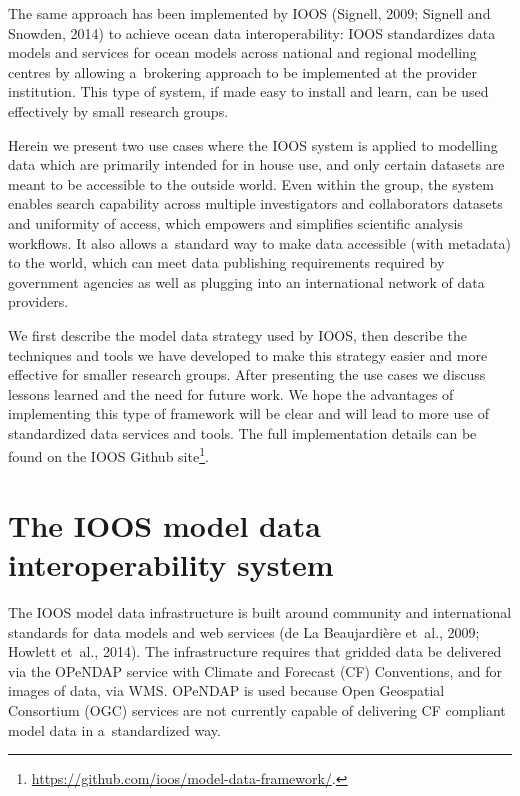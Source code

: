 \documentclass[osd, online, hvmath]{copernicus}
\begin{document}
The same approach has been implemented  by IOOS (Signell, 2009; Signell and Snowden, 2014) to achieve ocean data interoperability: IOOS standardizes data models and services for ocean models across national and regional modelling centres by allowing a~brokering approach to be implemented at the provider institution. This type of
system, if made easy to install and learn, can be used effectively by
small research groups.

Herein we present two use cases where the IOOS system is applied to
modelling data which are primarily intended for in house use, and only
certain datasets are meant to be accessible to the outside world. Even
within the group, the system enables search capability across multiple
investigators and collaborators datasets and uniformity of access,
which empowers and simplifies scientific analysis workflows. It also
allows   a~standard way to make data accessible (with metadata) to
the world, which can meet data publishing requirements required by
government agencies as well as plugging into an international network
of data providers.

We first describe the model data strategy used by IOOS, then describe
the techniques and tools we have developed to make this strategy
easier and more effective for smaller research groups. 
After presenting the use cases we discuss lessons learned and the need for future work. 
We hope the advantages of implementing this type of framework will be clear and will 
lead to more use of standardized data services and tools.  The full implementation details
can be found on the IOOS Github site\footnote{\url{https://github.com/ioos/model-data-framework/}.}.





\section{The IOOS model data interoperability system}

The IOOS model data infrastructure is built around community and
international standards for data models and web services (de La
Beaujardi\`{e}re et~al., 2009; Howlett et~al., 2014). The
infrastructure requires that gridded data be delivered via the OPeNDAP
service with Climate and Forecast (CF) Conventions, and for images of data, via WMS. OPeNDAP is used
because Open Geospatial Consortium (OGC) services are not currently capable of delivering CF
compliant model data in a~standardized way.
\end{document}
